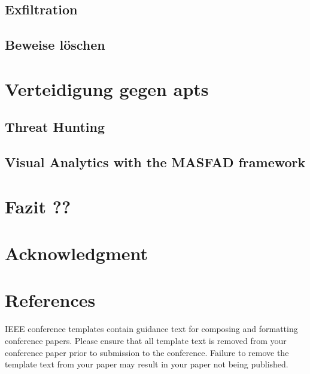 \documentclass[conference]{IEEEtran}
\begin{document}
\subsection{Exfiltration}
\subsection{Beweise löschen}

\section{Verteidigung gegen \aclp{apt}}
\subsection{Threat Hunting}
\subsection{Visual Analytics with the MASFAD framework}
\section{Fazit ??}

\section*{Acknowledgment}

\section*{References}

\balance





\vspace{12pt}
\color{red}
IEEE conference templates contain guidance text for composing and formatting conference papers. Please ensure that all template text is removed from your conference paper prior to submission to the conference. Failure to remove the template text from your paper may result in your paper not being published.
\end{document}
